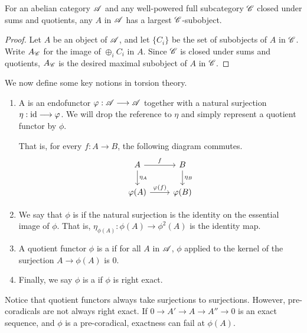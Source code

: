 \begin{prop}\label{prop_max_subobj}
For an abelian category $\mathscr{A}$ and any well-powered full 
subcategory $\mathscr{C}$ closed under sums and quotients, any $A$ in 
$\mathscr{A}$ has a largest $\mathscr{C}$-subobject.
\end{prop}
\begin{proof}
Let $A$ be an object of $\mathscr{A}$, and let $\{C_i\}$ be the set 
of subobjects of $A$ in $\mathscr{C}$. Write $A_{\mathscr{C}}$ for the
image of $\oplus_{i} C_i$ in $A$. Since $\mathscr{C}$ is closed under
sums and quotients, $A_{\mathscr{C}}$ is the desired maximal subobject 
of $A$ in $\mathscr{C}$.
\end{proof}

We now define some key notions in torsion theory.

\begin{defn}\label{def_coradical}
\begin{enumerate}
\item A  is an endofunctor $\varphi : \mathscr{A} 
\longrightarrow \mathscr{A}$ together with a natural surjection $\eta: \mathrm{id} \longrightarrow 
\varphi$. We will drop the reference to $\eta$ and simply represent
a quotient functor by $\phi$.

That is, for every $f: A \to B$, the following diagram commutes.
\[
\begin{tikzcd}
A \arrow{r}{f} \arrow{d}{\eta_A} &
B \arrow{d}{\eta_B} \\
\phi(A) \arrow{r}{\phi(f)} 
&\phi(B)
\end{tikzcd}
\]

\item We say that $\phi$ is  if the natural 
surjection is the identity on the essential image of $\phi$.
That is, $\eta_{\phi(A)}: \phi(A) \to \phi^2(A)$ is the identity 
map.

\item A quotient functor $\phi$ is a  if for all
$A$ in $\mathscr{A}$, $\phi$ applied to the kernel of the surjection 
$A \to \phi(A)$ is $0$.

\item Finally, we say $\phi$ is a  if $\phi$ is
right exact.
\end{enumerate}
\end{defn}

\begin{rmk}
Notice that quotient functors always take surjections to 
surjections. However, pre-coradicals are not always right exact.
If $0 \to A' \to A \to A'' \to 0$ is an exact sequence, and $\phi$
is a pre-coradical, exactness can fail at $\phi(A)$.
\end{rmk}

